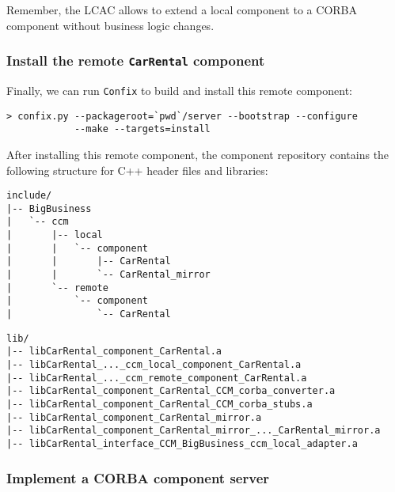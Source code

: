 Remember, the LCAC allows to extend a local component to a CORBA component
without business logic changes. 


\newpage
\subsubsection{Install the remote {\tt CarRental} component}
Finally, we can run {\tt Confix} to build and install this remote component:
\begin{small}
\begin{verbatim}
> confix.py --packageroot=`pwd`/server --bootstrap --configure 
            --make --targets=install
\end{verbatim}
\end{small}

After installing this remote component, the component repository contains
the following structure for C++ header files and libraries:
\begin{small}
\begin{verbatim}
include/
|-- BigBusiness
|   `-- ccm
|       |-- local
|       |   `-- component
|       |       |-- CarRental
|       |       `-- CarRental_mirror
|       `-- remote
|           `-- component
|               `-- CarRental
\end{verbatim}
\end{small}

\begin{small}
\begin{verbatim}
lib/
|-- libCarRental_component_CarRental.a
|-- libCarRental_..._ccm_local_component_CarRental.a
|-- libCarRental_..._ccm_remote_component_CarRental.a
|-- libCarRental_component_CarRental_CCM_corba_converter.a
|-- libCarRental_component_CarRental_CCM_corba_stubs.a
|-- libCarRental_component_CarRental_mirror.a
|-- libCarRental_component_CarRental_mirror_..._CarRental_mirror.a
|-- libCarRental_interface_CCM_BigBusiness_ccm_local_adapter.a
\end{verbatim}
\end{small}


\newpage
\subsubsection{Implement a CORBA component server}

